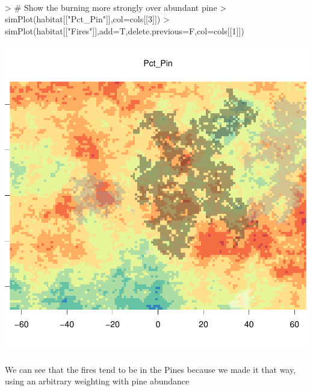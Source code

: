 \documentclass{article}
\begin{document}
\paragraph{}


\begin{Schunk}
\begin{Sinput}
> # Show the burning more strongly over abundant pine
> simPlot(habitat[["Pct_Pin"]],col=cols[[3]])
> simPlot(habitat[["Fires"]],add=T,delete.previous=F,col=cols[[1]])
\end{Sinput}
\end{Schunk}
\includegraphics{introduction-fire-overlaid}


\paragraph{}
We can see that the fires tend to be in the Pines because we made it that way, using an arbitrary weighting with pine abundance
\end{document}

